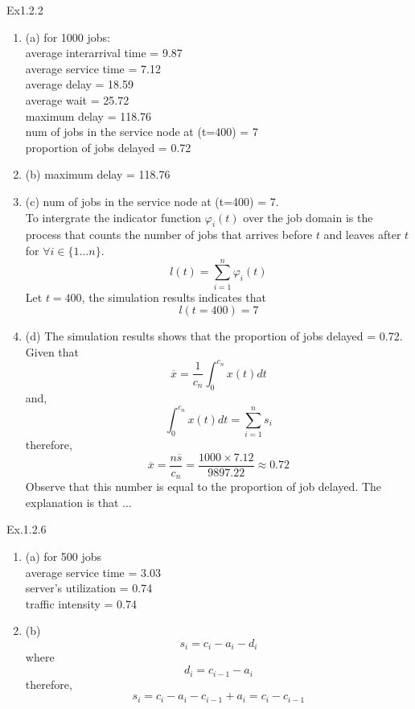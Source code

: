 \documentclass[11pt]{article}
\theoremstyle{definition}
\begin{document}
\begin{enumerate}[leftmargin=0pt, itemsep=3ex]

    \problemitem Ex1.2.2
        \begin{enumerate}
        \item (a) for 1000 jobs:
   \\ average interarrival time = 9.87
   \\ average service time = 7.12
   \\ average delay = 18.59
   \\ average wait = 25.72
   \\ maximum delay = 118.76
   \\ num of jobs in the service node at (t=400) = 7
   \\ proportion of jobs delayed = 0.72
    
    \item (b) maximum delay = 118.76
    \item (c) num of jobs in the service node at (t=400) = 7.
    \\To intergrate the indicator function $\varphi_i(t)$ over the job domain is the process that counts the number of jobs  that arrives before $t$ and leaves after $t$ for $\forall i \in \{1...n\}$.
    $$l(t) = \sum_{i=1}^{n} \varphi_i(t)$$ Let $t=400$, the simulation results indicates that $$l(t=400) = 7$$ 
    \item (d) The simulation results shows that the proportion of jobs delayed = 0.72. Given that $$\overline{x} = \frac{1}{c_n} \int_{0}^{c_n}x(t)dt$$
    and, $$\int_{0}^{c_n}x(t)dt = \sum_{i=1}^{n}s_i$$
    therefore, $$\overline{x} = \frac{n \overline{s}}{c_n} = \frac{1000 \times 7.12}{9897.22} \approx 0.72$$
    Observe that this number is equal to the proportion of job delayed. The explanation is that ...
    
    \end{enumerate}

    \problemitem Ex.1.2.6
    
    \begin{enumerate}
        \item (a)
        for 500 jobs
        \\average service time = 3.03
        \\server's utilization = 0.74
        \\traffic intensity = 0.74
        \item (b)   
        $$
        s_i = c_i - a_i - d_i
        $$
        where
        $$
        d_i = c_{i-1} - a_i
        $$
        therefore,
        $$
        s_i = c_i - a_i - c_{i-1} + a_i = c_i - c_{i-1}
        $$
    \end{enumerate}


\end{enumerate}
\end{document}
